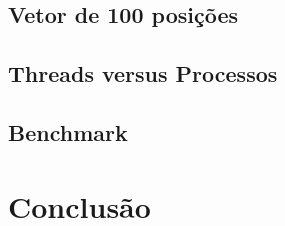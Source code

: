 \documentclass[
	12pt,				%
	openright,			%
	oneside,			%
	a4paper,			%
	chapter=TITLE,		%
	english,			%
	french,				%
	spanish,			%
	brazil				%
	]{abntex2}
\theoremstyle{definition}
\begin{document}
\section{Vetor de 100 posições}

\section{Threads versus Processos}

\section{Benchmark}

\chapter{Conclusão}
\label{conclusao}





\postextual



\cite{tanenbaum2010sistemas}
\end{document}
